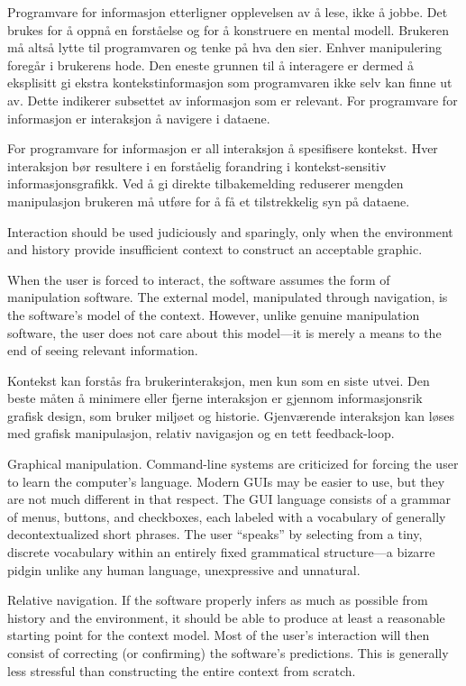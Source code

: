 {Programvare for informasjon etterligner opplevelsen av å lese, ikke å jobbe. Det brukes for å oppnå en forståelse og for å konstruere en mental modell. Brukeren må altså lytte til programvaren og tenke på hva den sier. Enhver manipulering foregår i brukerens hode. Den eneste grunnen til å interagere er dermed å eksplisitt gi ekstra kontekstinformasjon som programvaren ikke selv kan finne ut av. Dette indikerer subsettet av informasjon som er relevant. For programvare for informasjon er interaksjon å navigere i dataene.

For programvare for informasjon er all interaksjon å spesifisere kontekst. Hver interaksjon bør resultere i en forståelig forandring i kontekst-sensitiv informasjonsgrafikk. Ved å gi direkte tilbakemelding reduserer mengden manipulasjon brukeren må utføre for å få et tilstrekkelig syn på dataene.

Interaction should be used judiciously and sparingly, only when the environment and history provide insufficient context to construct an acceptable graphic.

When the user is forced to interact, the software assumes the form of manipulation software. The external model, manipulated through navigation, is the software’s model of the context. However, unlike genuine manipulation software, the user does not care about this model—it is merely a means to the end of seeing relevant information.

Kontekst kan forstås fra brukerinteraksjon, men kun som en siste utvei. Den beste måten å minimere eller fjerne interaksjon er gjennom informasjonsrik grafisk design, som bruker miljøet og historie. Gjenværende interaksjon kan løses med grafisk manipulasjon, relativ navigasjon og en tett feedback-loop.

Graphical manipulation. Command-line systems are criticized for forcing the user to learn the computer’s language. Modern GUIs may be easier to use, but they are not much different in that respect. The GUI language consists of a grammar of menus, buttons, and checkboxes, each labeled with a vocabulary of generally decontextualized short phrases. The user “speaks” by selecting from a tiny, discrete vocabulary within an entirely fixed grammatical structure—a bizarre pidgin unlike any human language, unexpressive and unnatural.

Relative navigation. If the software properly infers as much as possible from history and the environment, it should be able to produce at least a reasonable starting point for the context model. Most of the user’s interaction will then consist of correcting (or confirming) the software’s predictions. This is generally less stressful than constructing the entire context from scratch.


}
